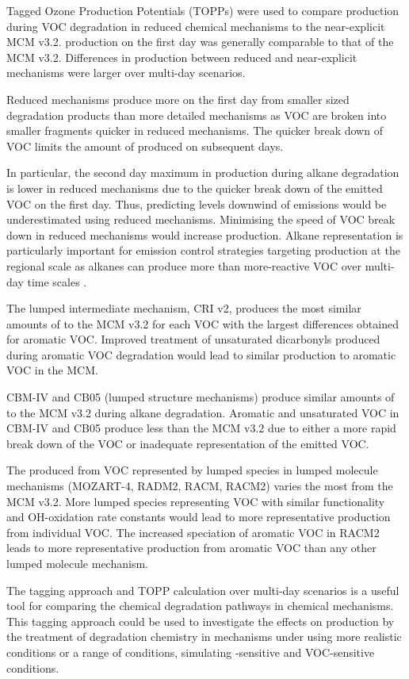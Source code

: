 Tagged Ozone Production Potentials (TOPPs) were used to compare  production during VOC degradation in reduced chemical mechanisms to the near-explicit MCM v3.2. 
 production on the first day was generally comparable to that of the MCM v3.2.
Differences in  production between reduced and near-explicit mechanisms were larger over multi-day scenarios.

Reduced mechanisms produce more  on the first day from smaller sized degradation products than more detailed mechanisms as VOC are broken into smaller fragments quicker in reduced mechanisms.
The quicker break down of VOC limits the amount of  produced on subsequent days.

In particular, the second day maximum in  production during alkane degradation is lower in reduced mechanisms due to the quicker break down of the emitted VOC on the first day.
Thus, predicting  levels downwind of emissions would be underestimated using reduced mechanisms.
Minimising the speed of VOC break down in reduced mechanisms would increase  production.  
Alkane representation is particularly important for emission control strategies targeting  production at the regional scale as alkanes can produce more  than more-reactive VOC over multi-day time scales \citep{Butler:2011}.

The lumped intermediate mechanism, CRI v2, produces the most similar amounts of  to the MCM v3.2 for each VOC with the largest differences obtained for aromatic VOC.
Improved treatment of unsaturated dicarbonyls produced during aromatic VOC degradation would lead to similar  production to aromatic VOC in the MCM.

CBM-IV and CB05 (lumped structure mechanisms) produce similar amounts of  to the MCM v3.2 during alkane degradation.
Aromatic and unsaturated VOC in CBM-IV and CB05 produce less  than the MCM v3.2 due to either a more rapid break down of the VOC or inadequate representation of the emitted VOC.

The  produced from VOC represented by lumped species in lumped molecule mechanisms (MOZART-4, RADM2, RACM, RACM2) varies the most from the MCM v3.2.
More lumped species representing VOC with similar functionality and OH-oxidation rate constants would lead to more representative  production from individual VOC.
The increased speciation of aromatic VOC in RACM2 leads to more representative  production from aromatic VOC than any other lumped molecule mechanism.

The tagging approach and TOPP calculation over multi-day scenarios is a useful tool for comparing the chemical degradation pathways in chemical mechanisms. 
This tagging approach could be used to investigate the effects on  production by the treatment of degradation chemistry in mechanisms under using more realistic  conditions or a range of  conditions, simulating -sensitive and VOC-sensitive conditions.
